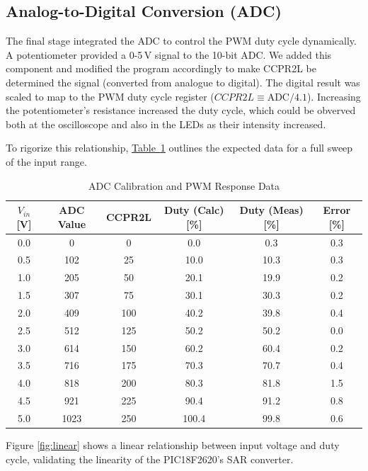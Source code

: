 \documentclass[a4paper,11pt]{article}
\begin{document}
  \subsection{Analog-to-Digital Conversion (ADC)}
  The final stage integrated the ADC to control the PWM duty cycle dynamically. A potentiometer provided a 0-5\,V signal to the 10-bit ADC. We added this component and modified the program accordingly to make CCPR2L be determined the signal (converted from analogue to digital). The digital result was scaled to map to the PWM duty cycle register ($CCPR2L \equiv \text{ADC}/4.1$). Increasing the potentiometer's resistance increased the duty cycle, which could be obverved both at the oscilloscope and also in the LEDs as their intensity increased. 

  To rigorize this relationship, \hyperref[tab:adc_data]{Table~\ref*{tab:adc_data}} outlines the expected data for a full sweep of the input range. 

  \begin{table}[H]
  \centering
  \caption{ADC Calibration and PWM Response Data}
  \label{tab:adc_data}
  \small
  \begin{tabular}{cccccc}
  \toprule
  \textbf{$V_{in}$ [V]} & \textbf{ADC Value} & \textbf{CCPR2L} & \textbf{Duty (Calc) [\%]} & \textbf{Duty (Meas) [\%]} & \textbf{Error [\%]} \\
  \midrule
  0.0 & 0 & 0 & 0.0 & 0.3 & 0.3 \\
  0.5 & 102 & 25 & 10.0 & 10.3 & 0.3 \\
  1.0 & 205 & 50 & 20.1 & 19.9 & 0.2 \\
  1.5 & 307 & 75 & 30.1 & 30.3 & 0.2 \\
  2.0 & 409 & 100 & 40.2 & 39.8 & 0.4 \\
  2.5 & 512 & 125 & 50.2 & 50.2 & 0.0 \\
  3.0 & 614 & 150 & 60.2 & 60.4 & 0.2 \\
  3.5 & 716 & 175 & 70.3 & 70.7 & 0.4 \\
  4.0 & 818 & 200 & 80.3 & 81.8 & 1.5 \\
  4.5 & 921 & 225 & 90.4 & 91.2 & 0.8 \\
  5.0 & 1023 & 250 & 100.4 & 99.8 & 0.6 \\
  \bottomrule
  \end{tabular}
  \end{table}

Figure \ref{fig:linear} shows a linear relationship between input voltage and duty cycle, validating the linearity of the PIC18F2620's SAR converter.
\end{document}
